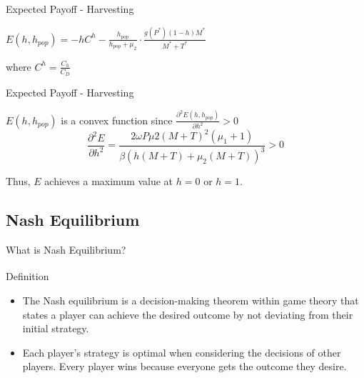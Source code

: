 \documentclass{beamer}
\begin{document}
\begin{frame}{Expected Payoff - Harvesting}
    \begin{center}
    $\displaystyle {E(h, h_{pop}) = -hC^{h} - \frac{h_{pop}}{h_{pop} + \mu_{2}} \cdot \frac{g(P^{*})(1-h)M^{*}}{M^{*} + T^{*}}}$ \\
    
    \vspace{0.6cm}
    
    where $C^{h} = \frac{C_{h}}{C_{D}}$
    \end{center}
\end{frame}

\begin{frame}{Expected Payoff - Harvesting}

$E(h, h_{pop})$ is a convex function since 
$\frac{\partial^{2}E(h, h_{pop})}{\partial h^{2}} > 0$ \\

$$\displaystyle {\frac{\partial ^ {2} E}{\partial h^{2}} = \frac{2 \omega P \mu{2} (M+T)^{2} (\mu_{1} +1)}{\beta(h(M+T) + \mu_{2}(M+T))^{3}} > 0}$$
\vspace{0.6cm}

Thus, $E$ achieves a maximum value at $h = 0$ or $h=1.$

\end{frame}

\subsection{Nash Equilibrium}
\begin{frame}{What is Nash Equilibrium?}
    \begin{block}{Definition\textsuperscript{\cite{nash_definition}}}
        \begin{itemize}
            \item The Nash equilibrium is a decision-making theorem within game theory that states a player can achieve the desired outcome by not deviating from their initial strategy.
            \item Each player's strategy is optimal when considering the decisions of other players. Every player wins because everyone gets the outcome they desire.
        \end{itemize}
    \end{block}
\end{frame}
\end{document}
